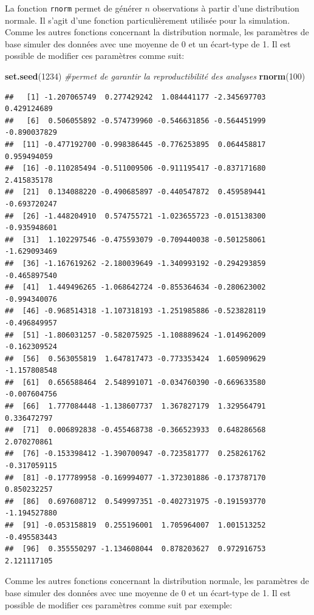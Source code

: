 \documentclass[
]{book}
\newenvironment{Shaded}{\begin{snugshade}}{\end{snugshade}}
\newcommand{\CommentTok}[1]{\textcolor[rgb]{0.56,0.35,0.01}{\textit{#1}}}
\newcommand{\DecValTok}[1]{\textcolor[rgb]{0.00,0.00,0.81}{#1}}
\newcommand{\FunctionTok}[1]{\textcolor[rgb]{0.13,0.29,0.53}{\textbf{#1}}}
\newcommand{\NormalTok}[1]{#1}
\begin{document}
La fonction \texttt{rnorm} permet de générer \(n\) observations à partir d'une distribution normale. Il s'agit d'une fonction particulièrement utilisée pour la simulation. Comme les autres fonctions concernant la distribution normale, les paramètres de base simuler des données avec une moyenne de 0 et un écart-type de 1. Il est possible de modifier ces paramètres comme suit:

\begin{Shaded}
\begin{Highlighting}[]
\FunctionTok{set.seed}\NormalTok{(}\DecValTok{1234}\NormalTok{) }\CommentTok{\#permet de garantir la reproductibilité des analyses }
\FunctionTok{rnorm}\NormalTok{(}\DecValTok{100}\NormalTok{) }
\end{Highlighting}
\end{Shaded}

\begin{verbatim}
##   [1] -1.207065749  0.277429242  1.084441177 -2.345697703  0.429124689
##   [6]  0.506055892 -0.574739960 -0.546631856 -0.564451999 -0.890037829
##  [11] -0.477192700 -0.998386445 -0.776253895  0.064458817  0.959494059
##  [16] -0.110285494 -0.511009506 -0.911195417 -0.837171680  2.415835178
##  [21]  0.134088220 -0.490685897 -0.440547872  0.459589441 -0.693720247
##  [26] -1.448204910  0.574755721 -1.023655723 -0.015138300 -0.935948601
##  [31]  1.102297546 -0.475593079 -0.709440038 -0.501258061 -1.629093469
##  [36] -1.167619262 -2.180039649 -1.340993192 -0.294293859 -0.465897540
##  [41]  1.449496265 -1.068642724 -0.855364634 -0.280623002 -0.994340076
##  [46] -0.968514318 -1.107318193 -1.251985886 -0.523828119 -0.496849957
##  [51] -1.806031257 -0.582075925 -1.108889624 -1.014962009 -0.162309524
##  [56]  0.563055819  1.647817473 -0.773353424  1.605909629 -1.157808548
##  [61]  0.656588464  2.548991071 -0.034760390 -0.669633580 -0.007604756
##  [66]  1.777084448 -1.138607737  1.367827179  1.329564791  0.336472797
##  [71]  0.006892838 -0.455468738 -0.366523933  0.648286568  2.070270861
##  [76] -0.153398412 -1.390700947 -0.723581777  0.258261762 -0.317059115
##  [81] -0.177789958 -0.169994077 -1.372301886 -0.173787170  0.850232257
##  [86]  0.697608712  0.549997351 -0.402731975 -0.191593770 -1.194527880
##  [91] -0.053158819  0.255196001  1.705964007  1.001513252 -0.495583443
##  [96]  0.355550297 -1.134608044  0.878203627  0.972916753  2.121117105
\end{verbatim}

Comme les autres fonctions concernant la distribution normale, les paramètres de base simuler des données avec une moyenne de 0 et un écart-type de 1. Il est possible de modifier ces paramètres comme suit par exemple:
\end{document}
